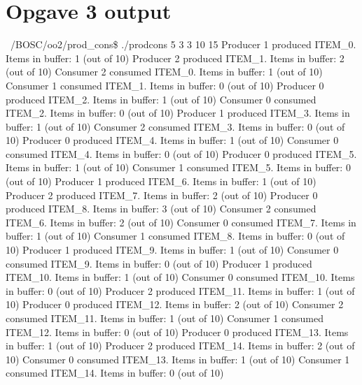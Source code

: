 \appendix
\label{Appendix}




\section{Opgave 3 output}
\label{O3_Output}
~/BOSC/oo2/prod_cons\$ ./prodcons 5 3 3 10 15
Producer 1 produced ITEM_0. Items in buffer: 1 (out of 10)
Producer 2 produced ITEM_1. Items in buffer: 2 (out of 10)
Consumer 2 consumed ITEM_0. Items in buffer: 1 (out of 10)
Consumer 1 consumed ITEM_1. Items in buffer: 0 (out of 10)
Producer 0 produced ITEM_2. Items in buffer: 1 (out of 10)
Consumer 0 consumed ITEM_2. Items in buffer: 0 (out of 10)
Producer 1 produced ITEM_3. Items in buffer: 1 (out of 10)
Consumer 2 consumed ITEM_3. Items in buffer: 0 (out of 10)
Producer 0 produced ITEM_4. Items in buffer: 1 (out of 10)
Consumer 0 consumed ITEM_4. Items in buffer: 0 (out of 10)
Producer 0 produced ITEM_5. Items in buffer: 1 (out of 10)
Consumer 1 consumed ITEM_5. Items in buffer: 0 (out of 10)
Producer 1 produced ITEM_6. Items in buffer: 1 (out of 10)
Producer 2 produced ITEM_7. Items in buffer: 2 (out of 10)
Producer 0 produced ITEM_8. Items in buffer: 3 (out of 10)
Consumer 2 consumed ITEM_6. Items in buffer: 2 (out of 10)
Consumer 0 consumed ITEM_7. Items in buffer: 1 (out of 10)
Consumer 1 consumed ITEM_8. Items in buffer: 0 (out of 10)
Producer 1 produced ITEM_9. Items in buffer: 1 (out of 10)
Consumer 0 consumed ITEM_9. Items in buffer: 0 (out of 10)
Producer 1 produced ITEM_10. Items in buffer: 1 (out of 10)
Consumer 0 consumed ITEM_10. Items in buffer: 0 (out of 10)
Producer 2 produced ITEM_11. Items in buffer: 1 (out of 10)
Producer 0 produced ITEM_12. Items in buffer: 2 (out of 10)
Consumer 2 consumed ITEM_11. Items in buffer: 1 (out of 10)
Consumer 1 consumed ITEM_12. Items in buffer: 0 (out of 10)
Producer 0 produced ITEM_13. Items in buffer: 1 (out of 10)
Producer 2 produced ITEM_14. Items in buffer: 2 (out of 10)
Consumer 0 consumed ITEM_13. Items in buffer: 1 (out of 10)
Consumer 1 consumed ITEM_14. Items in buffer: 0 (out of 10)
